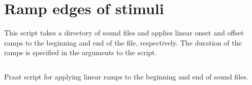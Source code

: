 \section{Ramp edges of stimuli}
This script takes a directory of sound files and applies linear onset and offset ramps to the beginning and end of the file, respectively.  The duration of the ramps is specified in the arguments to the script. 
\begin{code}
	\inputminted[fontsize=\footnotesize, tabsize=2]{r}{../scripts/RampEdges_DissVersion.praat}
	\caption[Ramp edges of stimuli]{Praat script for applying linear ramps to the beginning and end of sound files.\label{lst:RampEdges}}
\end{code}
\newpage

